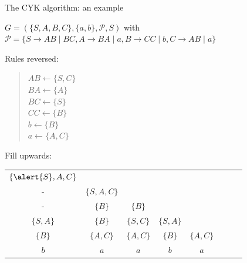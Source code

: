 \documentclass[handout]{beamer}
\begin{document}
\begin{frame}{The CYK algorithm: an example}

	\begin{example}
	$G=(\{S,A,B,C\},\{a,b\},\mathcal P,S)$ with $\mathcal P=\{S\to AB\mid BC, A\to BA\mid a, B\to CC\mid b, C\to AB\mid a\}$
	\end{example}
	\vspace{-6pt}
	Rules reversed:\vspace{-6pt}
	\begin{quote}
		\begin{multicols}{4}\small
			$AB  \leftarrow  \{S,C\}$\\
			$BA  \leftarrow  \{A\}$\\
			$BC  \leftarrow  \{S\}$\\
			$CC  \leftarrow  \{B\}$\\
			$b   \leftarrow  \{B\}$\\
			$a   \leftarrow  \{A,C\}$
		\end{multicols}	
	\end{quote}

	\vspace{-12pt}
	Fill upwards:
	\vspace{3pt}

	\begin{center}
		\begin{tabular}{|c c c c c c c c}
			$\{\alert{S},A,C\}$ \\ 
			- &  $\{S,A,C\}$  \\ 
			- &  $\{B\}$ &  $\{B\}$ \\ 
			$\{S,A\}$ &  $\{B\}$ & $\{S,C\}$ &  $\{S,A\}$ \\ 
			$\{B\}$ & $\{A,C\}$ &  $\{A,C\}$ &$\{B\}$ &$\{A,C\}$ \\ %
			\rowcolor{Gray}$b$&$a$&$a$&$b$&$a$
		\end{tabular}
	\end{center}
\end{frame}
\end{document}

